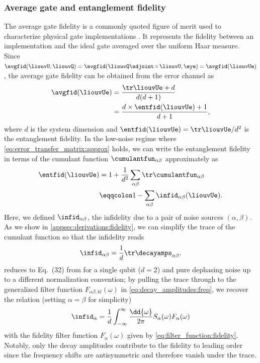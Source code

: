 \subsubsection{Average gate and entanglement fidelity}\label{sec:theory:derived_quantities:entanglement_fidelity}
The average gate fidelity is a commonly quoted figure of merit used to characterize physical gate implementations \cite{Loss1998,Ladd2010,Chow2012,Veldhorst2014,Yoneda2018}. It represents the fidelity between an implementation \liouvU and the ideal gate \liouvQ averaged over the uniform Haar measure. Since $\avgfid(\liouvU, \liouvQ) = \avgfid(\liouvQ\adjoint\circ\liouvU, \eye) = \avgfid(\liouvUe)$, the average gate fidelity can be obtained from the error channel \liouvUe as \cite{Horodecki1999,Nielsen2002}
\begin{align}
    \avgfid(\liouvUe) &= \frac{\tr\liouvUe + d}{d(d+1)} \label{eq:fidelity:avg}\\
                      &= \frac{d\times\entfid(\liouvUe) + 1}{d + 1}, \label{eq:fidelity:avg-ent}
\end{align}
where $d$ is the system dimension and $\entfid(\liouvUe) = \tr\liouvUe / d^2$ is the entanglement fidelity. In the low-noise regime where \cref{eq:error_transfer_matrix:approx} holds, we can write the entanglement fidelity in terms of the cumulant function $\cumulantfun_{\alpha\beta}$ approximately as
\begin{align}\label{eq:fidelity:ent}
    \entfid(\liouvUe) &= 1 + \frac{1}{d^2}\sum_{\alpha\beta}\tr\cumulantfun_{\alpha\beta} \\
                      &\eqqcolon 1 - \sum_{\alpha\beta}\infid_{\alpha\beta}(\liouvUe).
\end{align}
Here, we defined $\infid_{\alpha\beta}$, the infidelity due to a pair of noise sources $(\alpha,\beta)$. As we show in \cref{appsec:derivations:fidelity}, we can simplify the trace of the cumulant function so that the infidelity reads
\begin{equation}\label{eq:infidelity:ent}
    \infid_{\alpha\beta} = \frac{1}{d}\tr\decayamps_{\alpha\beta}.
\end{equation}
 reduces to Eq.~(32) from  for a single qubit ($d=2$) and pure dephasing noise up to a different normalization convention; by pulling the trace through to the generalized filter function $F_{\alpha\beta,kl}(\omega)$ in \cref{eq:decay_amplitudes:freq}, we recover the relation (setting $\alpha=\beta$ for simplicity)
\begin{equation}\label{eq:infidelity:ent:integral}
    \infid_{\alpha} = \frac{1}{d}\int_{-\infty}^\infty\frac{\dd{\omega}}{2\pi} S_{\alpha}(\omega) F_{\alpha}(\omega)
\end{equation}
with the fidelity filter function $F_{\alpha}(\omega)$ given by \cref{eq:filter_function:fidelity}. Notably, only the decay amplitudes \decayamps contribute to the fidelity to leading order since the frequency shifts \freqshifts are antisymmetric and therefore vanish under the trace.

